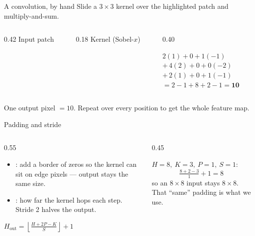 \documentclass[10pt,aspectratio=169]{beamer}
\begin{document}
\begin{frame}{A convolution, by hand}
  Slide a $3\times3$ kernel over the highlighted patch and multiply-and-sum.
  \begin{columns}[T]
    \begin{column}{0.42\textwidth}
      \centering \small Input patch\\[3pt]
    \end{column}
    \begin{column}{0.18\textwidth}
      \centering \small Kernel (Sobel-$x$)\\[3pt]
    \end{column}
    \begin{column}{0.40\textwidth}
      \begin{mathbox}
        $2(1)+0+1(-1)$\\
        $+\,4(2)+0+0(-2)$\\
        $+\,2(1)+0+1(-1)$\\
        $=2-1+8+2-1 = \mathbf{10}$
      \end{mathbox}
    \end{column}
  \end{columns}
  \vspace{2pt}
  One output pixel $=10$. Repeat over every position to get the whole feature map.
\end{frame}

\begin{frame}{Padding and stride}
  \begin{columns}[T]
    \begin{column}{0.55\textwidth}
      \begin{itemize}
        \item {}: add a border of zeros so the kernel can sit on edge pixels --- output stays the same size.
        \item {}: how far the kernel hops each step. Stride 2 halves the output.
      \end{itemize}
      \begin{mathbox}
        $\displaystyle H_{\text{out}}=\left\lfloor\frac{H+2P-K}{S}\right\rfloor+1$
      \end{mathbox}
    \end{column}
    \begin{column}{0.45\textwidth}
      \begin{infobox}
        $H=8,\ K=3,\ P=1,\ S=1$:
        \[ \tfrac{8+2-3}{1}+1 = 8 \]
        so an $8\times8$ input stays $8\times8$. That ``same'' padding is what we use.
      \end{infobox}
    \end{column}
  \end{columns}
\end{frame}
\end{document}
